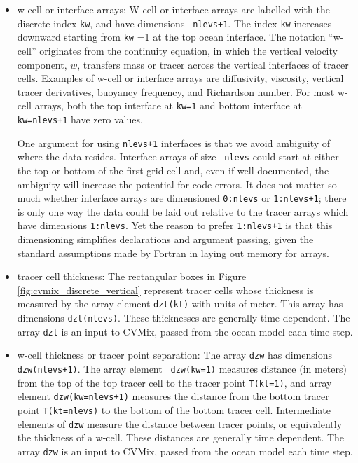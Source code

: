 \begin{itemize}
\item {\sc w-cell or interface arrays}: W-cell or interface arrays are
  labelled with the discrete index {\tt kw}, and have dimensions {\tt
    nlevs+1}.  The index {\tt kw} increases downward starting from
  {\tt kw} =1 at the top ocean interface.  The notation ``w-cell''
  originates from the continuity equation, in which the vertical
  velocity component, $w$, transfers mass or tracer across the
  vertical interfaces of tracer cells.  Examples of w-cell or
  interface arrays are diffusivity, viscosity, vertical tracer
  derivatives, buoyancy frequency, and Richardson number.  For most
  w-cell arrays, both the top interface at {\tt kw=1} and bottom
  interface at {\tt kw=nlevs+1} have zero values.

  One argument for using {\tt nlevs+1} interfaces is that we avoid
  ambiguity of where the data resides. Interface arrays of size {\tt
    nlevs} could start at either the top or bottom of the first grid
  cell and, even if well documented, the ambiguity will increase the
  potential for code errors.  It does not matter so much whether
  interface arrays are dimensioned {\tt 0:nlevs} or {\tt 1:nlevs+1};
  there is only one way the data could be laid out relative to the
  tracer arrays which have dimensions {\tt 1:nlevs}. Yet the reason to
  prefer {\tt 1:nlevs+1} is that this dimensioning simplifies
  declarations and argument passing, given the standard assumptions
  made by Fortran in laying out memory for arrays.

 
\item {\sc tracer cell thickness}: The rectangular boxes in Figure
  \ref{fig:cvmix_discrete_vertical} represent tracer cells whose
  thickness is measured by the array element {\tt dzt(kt)} with units
  of meter. This array has dimensions {\tt dzt(nlevs)}.  These
  thicknesses are generally time dependent.  The array {\tt dzt} is an
  input to CVMix, passed from the ocean model each time step.

\item {\sc w-cell thickness or tracer point separation}: The array
  {\tt dzw} has dimensions {\tt dzw(nlevs+1)}.  The array element {\tt
    dzw(kw=1)} measures distance (in meters) from the top of the top
  tracer cell to the tracer point {\tt T(kt=1)}, and array element
  {\tt dzw(kw=nlevs+1)} measures the distance from the bottom tracer
  point {\tt T(kt=nlevs)} to the bottom of the bottom tracer cell.
  Intermediate elements of {\tt dzw} measure the distance between
  tracer points, or equivalently the thickness of a w-cell.  These
  distances are generally time dependent.  The array {\tt dzw} is an
  input to CVMix, passed from the ocean model each time step.


\end{itemize}
